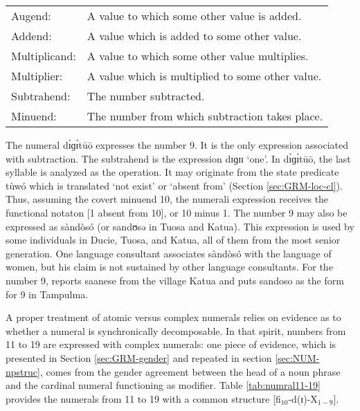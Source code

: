 \begin{exe}
\begin{exe}
\begin{exe}
{\begin{exe}
\begin{exe}
\begin{exe}
\begin{exe}
\begin{exe}
\begin{exe}
\begin{exe}
\begin{exe}
\begin{exe}
\vspace{3ex}

\begin{tabular}{ll}
{ Augend:} & A value to which some other value is
added.\\
{ Addend:} & A value which is added to some other
value.\\
{ Multiplicand:} & A value to which some other
value multiplies.\\

{ Multiplier:} & A value which is multiplied to
some other value.\\

{ Subtrahend:}  & The number subtracted.\\
{ Minuend:}  & The number from which subtraction takes
place.\\
\end{tabular}
\vspace*{10pt}


The numeral {\sls   dɪ́ɡɪ́tūō} expresses the number 9. It is the only
expression associated with subtraction.  The subtrahend is the expression {\sls 
dɪɡɪɪ} `one'.   In {\sls   dɪ́ɡɪ́tūō},  the last syllable   is analyzed
as the
operation. It may originate from the state predicate  {\sls tùwó} which is
translated 
`not exist'  or `absent from' (Section \ref{sec:GRM-loc-cl}). Thus, assuming the
covert minuend 10, the numerali
expression receives the functional notaton [1 {\sc absent from} 10], or 10
minus 1.  The number 9 may also be expressed as {\sls sàndòsó}  (or
{\sls sandʊsə} in Tuosa and Katua). This expression is
used by some individuals in Ducie, Tuosa, and Katua, all of them from the most
senior generation.  One language consultant
associates  {\sls sàndòsó} with the language of women, but his claim is not
sustained by other language consultants. For the number 9, \citet[33]{Good54}
reports
{\sls saanese}
from the village Katua and  \citet[117]{Ratt32b} puts {\sls sandoso} as the form
 for 9 in Tampulma. 

 
A proper  treatment of  atomic versus  complex numerals   relies  on evidence as
to whether
a numeral is synchronically  decomposable. In  that spirit,  numbers from 
11 to 19 are expressed with  complex numerals:  one piece of evidence, which is
presented in Section \ref{sec:GRM-gender} and repeated in section
\ref{sec:NUM-npstruc}, comes from the gender agreement between the head of a
noun phrase and the
cardinal numeral functioning as modifier.  Table \ref{tab:numral11-19}
provides the  numerals from 11 to 19 with a common structure
[fi$_{10}$-d(ɪ)-X$_{1-9}$]. 





\end{exe}
\end{exe}
\end{exe}
\end{exe}
\end{exe}
\end{exe}
\end{exe}
\end{exe}
\end{exe}}
\end{exe}
\end{exe}
\end{exe}
